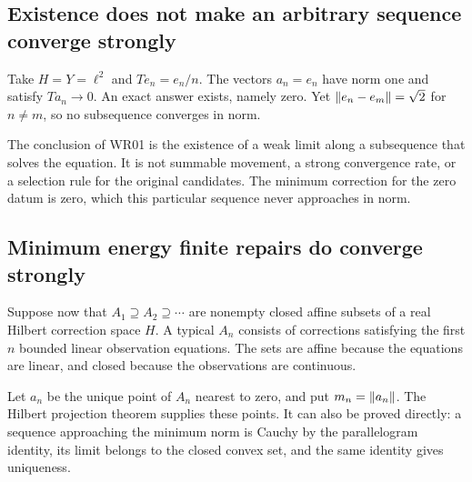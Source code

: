 \subsection{Existence does not make an arbitrary sequence converge strongly}
Take $H=Y=\ell^2$ and $Te_n=e_n/n$. The vectors $a_n=e_n$ have norm one and satisfy $Ta_n\to0$. An exact answer exists, namely zero. Yet $\left\lVert e_n-e_m\right\rVert=\sqrt2$ for $n\ne m$, so no subsequence converges in norm.

The conclusion of WR01 is the existence of a weak limit along a subsequence that solves the equation. It is not summable movement, a strong convergence rate, or a selection rule for the original candidates. The minimum correction for the zero datum is zero, which this particular sequence never approaches in norm.

\subsection{Minimum energy finite repairs do converge strongly}

Suppose now that $A_1\supseteq A_2\supseteq\cdots$ are nonempty closed affine subsets of a real Hilbert correction space $H$. A typical $A_n$ consists of corrections satisfying the first $n$ bounded linear observation equations. The sets are affine because the equations are linear, and closed because the observations are continuous.

Let $a_n$ be the unique point of $A_n$ nearest to zero, and put $m_n=\left\lVert a_n\right\rVert$. The Hilbert projection theorem supplies these points. It can also be proved directly: a sequence approaching the minimum norm is Cauchy by the parallelogram identity, its limit belongs to the closed convex set, and the same identity gives uniqueness.

